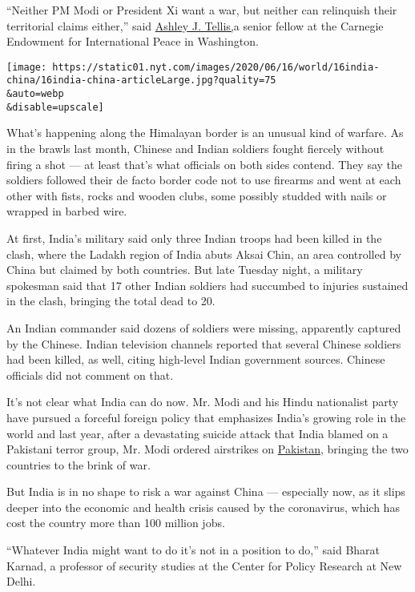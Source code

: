 ``Neither PM Modi or President Xi want a war, but neither can relinquish
their territorial claims either,'' said
\href{https://carnegieendowment.org/experts/198}{Ashley J. Tellis,}a
senior fellow at the Carnegie Endowment for International Peace in
Washington.

\texttt{[image: https://static01.nyt.com/images/2020/06/16/world/16india-china/16india-china-articleLarge.jpg?quality=75\\\&auto=webp\\\&disable=upscale]}

What's happening along the Himalayan border is an unusual kind of
warfare. As in the brawls last month, Chinese and Indian soldiers fought
fiercely without firing a shot --- at least that's what officials on
both sides contend. They say the soldiers followed their de facto border
code not to use firearms and went at each other with fists, rocks and
wooden clubs, some possibly studded with nails or wrapped in barbed
wire.

At first, India's military said only three Indian troops had been killed
in the clash, where the Ladakh region of India abuts Aksai Chin, an area
controlled by China but claimed by both countries. But late Tuesday
night, a military spokesman said that 17 other Indian soldiers had
succumbed to injuries sustained in the clash, bringing the total dead to
20.

An Indian commander said dozens of soldiers were missing, apparently
captured by the Chinese. Indian television channels reported that
several Chinese soldiers had been killed, as well, citing high-level
Indian government sources. Chinese officials did not comment on that.

It's not clear what India can do now. Mr. Modi and his Hindu nationalist
party have pursued a forceful foreign policy that emphasizes India's
growing role in the world and last year, after a devastating suicide
attack that India blamed on a Pakistani terror group, Mr. Modi ordered
airstrikes on
\href{https://www.nytimes.com/2020/06/29/world/asia/pakistan-stock-exchange-shooting.html}{Pakistan},
bringing the two countries to the brink of war.

But India is in no shape to risk a war against China --- especially now,
as it slips deeper into the economic and health crisis caused by the
coronavirus, which has cost the country more than 100 million jobs.

``Whatever India might want to do it's not in a position to do,'' said
Bharat Karnad, a professor of security studies at the Center for Policy
Research at New Delhi.

